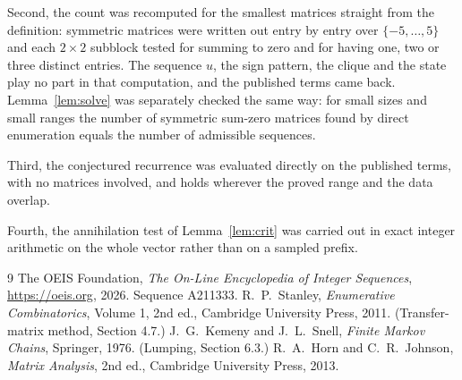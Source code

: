\documentclass[11pt,a4paper]{article}
\theoremstyle{plain}
\theoremstyle{definition}
\begin{document}
Second, the count was recomputed for the smallest matrices straight from the definition:
symmetric matrices were written out entry by entry over $\{-5,\dots,5\}$ and each
$2\times2$ subblock tested for summing to zero and for having one, two or three distinct entries. The
sequence $u$, the sign pattern, the clique and the state play no part in that computation, and
the published terms came back. Lemma~\ref{lem:solve} was separately checked the same way: for
small sizes and small ranges the number of symmetric sum-zero matrices found by direct
enumeration equals the number of admissible sequences.

Third, the conjectured recurrence was evaluated directly on the published terms, with no
matrices involved, and holds wherever the proved range and the data overlap.

Fourth, the annihilation test of Lemma~\ref{lem:crit} was carried out in exact integer
arithmetic on the whole vector rather than on a sampled prefix.

\begin{thebibliography}{9}
 The OEIS Foundation, \emph{The On-Line Encyclopedia of Integer
Sequences}, \url{https://oeis.org}, 2026. Sequence A211333.
 R.~P.~Stanley, \emph{Enumerative Combinatorics}, Volume 1, 2nd ed.,
Cambridge University Press, 2011. (Transfer-matrix method, Section 4.7.)
 J.~G.~Kemeny and J.~L.~Snell, \emph{Finite Markov Chains}, Springer, 1976.
(Lumping, Section 6.3.)
 R.~A.~Horn and C.~R.~Johnson, \emph{Matrix Analysis}, 2nd ed., Cambridge
University Press, 2013.
\end{thebibliography}
\end{document}
